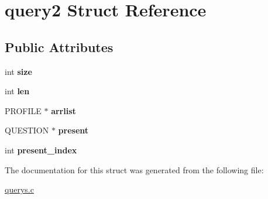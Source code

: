 \hypertarget{structquery2}{}\section{query2 Struct Reference}
\label{structquery2}
\subsection*{Public Attributes}
\begin{DoxyCompactItemize}
\item 
int {\bfseries size}\hypertarget{structquery2_a9b20ed0d7d13fc56437c325aee72b180}{}\label{structquery2_a9b20ed0d7d13fc56437c325aee72b180}

\item 
int {\bfseries len}\hypertarget{structquery2_ac920c41cc1b8960cce3356ce5e914999}{}\label{structquery2_ac920c41cc1b8960cce3356ce5e914999}

\item 
P\+R\+O\+F\+I\+LE $\ast$ {\bfseries arrlist}\hypertarget{structquery2_aff0968f1972191581dd93ccacef02aa6}{}\label{structquery2_aff0968f1972191581dd93ccacef02aa6}

\item 
Q\+U\+E\+S\+T\+I\+ON $\ast$ {\bfseries present}\hypertarget{structquery2_a4a0cead1e79c98d4738ad4d8f9004d2b}{}\label{structquery2_a4a0cead1e79c98d4738ad4d8f9004d2b}

\item 
int {\bfseries present\+\_\+index}\hypertarget{structquery2_a44d4c71f31473dbb0e3ba40e22d1547d}{}\label{structquery2_a44d4c71f31473dbb0e3ba40e22d1547d}

\end{DoxyCompactItemize}


The documentation for this struct was generated from the following file\+:\begin{DoxyCompactItemize}
\item 
\hyperlink{querys_8c}{querys.\+c}\end{DoxyCompactItemize}
